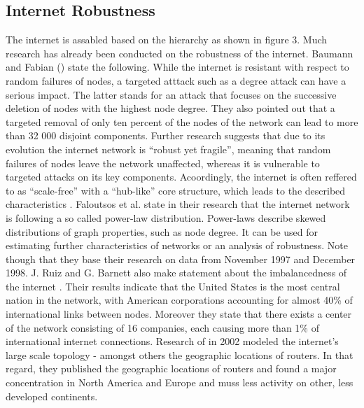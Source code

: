 \documentclass[conference, 11pt]{IEEEtran}
\begin{document}
\subsection{Internet Robustness}
The internet is assabled based on the hierarchy as shown in figure 3. Much research has already been conducted on the robustness of the internet. 
Baumann and Fabian (\cite{howRobust}) state the following. While the internet is resistant with respect to random failures of nodes, a targeted atttack such as a degree attack can have a serious impact. The latter stands for an attack that focuses on the successive deletion of nodes with the highest node degree. They also pointed out that a targeted removal of only ten percent of the nodes of the network can lead to more than 32 000 disjoint components. Further research suggests that due to its evolution the internet network  is ``robust yet fragile''\cite{RYF}, meaning that random failures of nodes leave the network unaffected, whereas it is vulnerable to targeted attacks on its key components. Acoordingly, the internet is often reffered to as ``scale-free'' with a ``hub-like'' core structure, which leads to the described characteristics \cite{RYF}. Faloutsos et al. \cite{powerlawCitation} state in their research that the internet network is following a so called power-law distribution. Power-laws describe skewed distributions of graph properties, such as node degree. It can be used for estimating further characteristics of networks or an analysis of robustness. Note though that they base their research on data from November 1997 and December 1998. J. Ruiz and G. Barnett also make statement about the imbalancedness of the internet \cite{owningInternet}. Their results indicate that the United States is the most central nation in the network, with American corporations accounting for almost 40\% of international links between nodes. Moreover they state that there exists a center of the network consisting of 16 companies, each causing more than 1\% of international internet connections.  
Research of \cite{geoResearch} in 2002 modeled the internet's large scale topology - amongst others the geographic locations of routers. In that regard, they published the geographic locations of routers and found a major concentration in North America and Europe and muss less activity on other, less developed continents.\\ 
 
\end{document}
